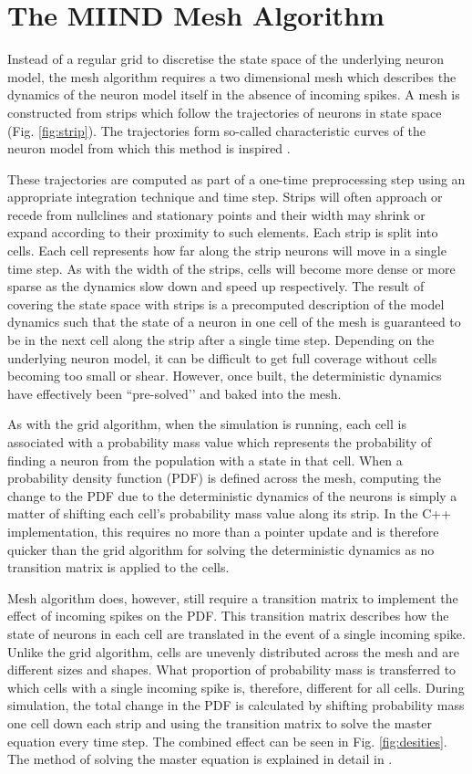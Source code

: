 \documentclass[utf8]{frontiersSCNS} %
\begin{document}
\section{The MIIND Mesh Algorithm}
\label{miindoverview}
Instead of a regular grid to discretise the state space of the underlying neuron model, the mesh algorithm requires a two dimensional mesh which describes the dynamics of the neuron model itself in the absence of incoming spikes. A mesh is constructed from strips which follow the trajectories of neurons in state space (Fig. \ref{fig:strip}). The trajectories form so-called characteristic curves of the neuron model from which this method is inspired \citep{de2019computational,de2013generic}.

These trajectories are computed as part of a one-time preprocessing step using an appropriate integration technique and time step. Strips will often approach or recede from nullclines and stationary points and their width may shrink or expand according to their proximity to such elements. Each strip is split into cells. Each cell represents how far along the strip neurons will move in a single time step. As with the width of the strips, cells will become more dense or more sparse as the dynamics slow down and speed up respectively. The result of covering the state space with strips is a precomputed description of the model dynamics such that the state of a neuron in one cell of the mesh is guaranteed to be in the next cell along the strip after a single time step. Depending on the underlying neuron model, it can be difficult to get full coverage without cells becoming too small or shear. However, once built, the deterministic dynamics have effectively been ``pre-solved’’ and baked into the mesh.

As with the grid algorithm, when the simulation is running, each cell is associated with a probability mass value which represents the probability of finding a neuron from the population with a state in that cell. When a probability density function (PDF) is defined across the mesh, computing the change to the PDF due to the deterministic dynamics of the neurons is simply a matter of shifting each cell's probability mass value along its strip. In the C++ implementation, this requires no more than a pointer update and is therefore quicker than the grid algorithm for solving the deterministic dynamics as no transition matrix is applied to the cells.

Mesh algorithm does, however, still require a transition matrix to implement the effect of incoming spikes on the PDF. This transition matrix describes how the state of neurons in each cell are translated in the event of a single incoming spike. Unlike the grid algorithm, cells are unevenly distributed across the mesh and are different sizes and shapes. What proportion of probability mass is transferred to which cells with a single incoming spike is, therefore, different for all cells. During simulation, the total change in the PDF is calculated by shifting probability mass one cell down each strip and using the transition matrix to solve the master equation every time step. The combined effect can be seen in Fig. \ref{fig:desities}. The method of solving the master equation is explained in detail in \cite{de2013generic}.
\end{document}
